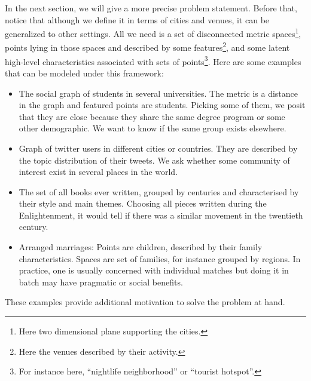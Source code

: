 In the next section, we will give a more precise problem statement. Before
that, notice that although we define it in terms of cities and venues, it can
be generalized to other settings. All we need is a set of disconnected metric
spaces\footnote{Here two dimensional plane supporting the cities.}, points
lying in those spaces and described by some features\footnote{Here the venues
described by their activity.}, and some latent high-level characteristics
associated with sets of points\footnote{For instance here, \enquote{nightlife
neighborhood} or \enquote{tourist hotspot}.}. Here are some examples that
can be modeled under this framework:
\begin{itemize}
	\label{:more-problems}
	\item The social graph of students in several universities. The metric
		is a distance in the graph and featured points are students.
		Picking some of them, we posit that they are close because
		they share the same degree program or some other demographic.
		We want to know if the same group exists elsewhere.
	\item Graph of twitter users in different cities or countries. They
		are described by the topic distribution of their tweets. We
		ask whether some community of interest exist in several places
		in the world.
	\item The set of all books ever written, grouped by centuries and
		characterised by their style and main themes. Choosing all
		pieces written during the Enlightenment, it would tell if
		there was a similar movement in the twentieth century.
	\item Arranged marriages: Points are children, described by their family
		characteristics. Spaces are set of families, for instance grouped by
		regions. In practice, one is usually concerned with individual matches
		 but doing it in batch may have pragmatic or social
		benefits.
\end{itemize}

These examples provide additional motivation to solve the problem at hand.
